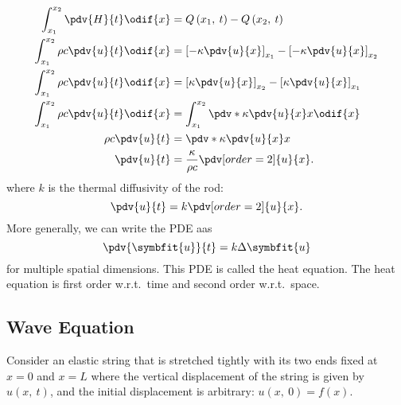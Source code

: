 \documentclass{article}
\begin{document}
\begin{align*}
    \int_{x_1}^{x_2} \pdv{H}{t} \odif{x}        & = Q\left( x_1,\: t \right) - Q\left( x_2,\: t \right)                               \\
    \int_{x_1}^{x_2} \rho c \pdv{u}{t} \odif{x} & = \left[ -\kappa \pdv{u}{x} \right]_{x_1} - \left[ -\kappa \pdv{u}{x} \right]_{x_2} \\
    \int_{x_1}^{x_2} \rho c \pdv{u}{t} \odif{x} & = \left[ \kappa \pdv{u}{x} \right]_{x_2} - \left[ \kappa \pdv{u}{x} \right]_{x_1}   \\
    \int_{x_1}^{x_2} \rho c \pdv{u}{t} \odif{x} & = \int_{x_1}^{x_2} \pdv*{\kappa \pdv{u}{x}}{x} \odif{x}                             \\
    \rho c \pdv{u}{t}                           & = \pdv*{\kappa \pdv{u}{x}}{x}                                                       \\
    \pdv{u}{t}                                  & = \frac{\kappa}{\rho c} \pdv[order=2]{u}{x}.
\end{align*}
where \(k\) is the thermal diffusivity of the rod:
\begin{equation*}
    \pdv{u}{t} = k\pdv[order=2]{u}{x}.
\end{equation*}
More generally, we can write the PDE aas
\begin{equation*}
    \pdv{\symbfit{u}}{t} = k \Delta{\symbfit{u}}
\end{equation*}
for multiple spatial dimensions. This PDE is called the heat equation.
The heat equation is first order w.r.t.\ time and second order w.r.t.\ space.
\subsection{Wave Equation}
Consider an elastic string that is stretched tightly with its two ends
fixed at \(x = 0\) and \(x = L\) where the vertical displacement of the
string is given by \(u\left( x,\: t \right)\), and the initial
displacement is arbitrary: \(u\left( x,\: 0 \right) = f\left( x
\right)\).
\end{document}
